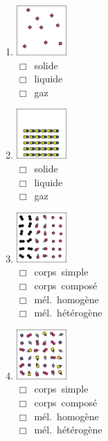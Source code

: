 \documentclass[
  11pt,
  a4paper,
  openany]{book}
\begin{document}
\begin{Exercise}
\begin{multicols}{3}
\columnbreak

\begin{enumerate}
\def\labelenumi{\alph{enumi}.}
\setcounter{enumi}{4}
\item
  \includegraphics[width=0.15\textwidth,height=\textheight]{images/melanges-corps-purs-60-e.png}\\
  \(\Box\)~solide\\
  \(\Box\)~liquide\\
  \(\Box\)~gaz
\item
  \includegraphics[width=0.15\textwidth,height=\textheight]{images/melanges-corps-purs-60-f.png}\\
  \(\Box\)~solide\\
  \(\Box\)~liquide\\
  \(\Box\)~gaz
\item
  \includegraphics[width=0.15\textwidth,height=\textheight]{images/melanges-corps-purs-60-g.png}\\
  \(\Box\)~corps~simple\\
  \(\Box\)~corps~composé\\
  \(\Box\)~mél.~homogène\\
  \(\Box\)~mél.~hétérogène
\item
  \includegraphics[width=0.15\textwidth,height=\textheight]{images/melanges-corps-purs-60-h.png}\\
  \(\Box\)~corps~simple\\
  \(\Box\)~corps~composé\\
  \(\Box\)~mél.~homogène\\
  \(\Box\)~mél.~hétérogène
\end{enumerate}


\end{multicols}
\end{Exercise}
\end{document}
